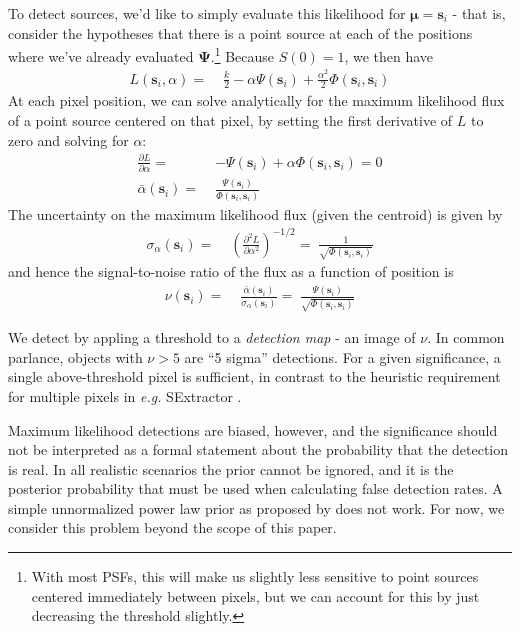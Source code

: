 \documentclass[10pt]{article}
\begin{document}
To detect sources, we'd like to simply evaluate this likelihood for $\bm{\mu} = \bm{s}_i$ - that is, consider the hypotheses that there is a point source at each of the positions where we've already evaluated $\bm{\Psi}$.\footnote{With most PSFs, this will make us slightly less sensitive to point sources centered immediately between pixels, but we can account for this by just decreasing the threshold slightly.}  Because $S(0)=1$, we then have
\begin{align}
L(\bm{s}_i,\alpha) =\;& \frac{k}{2} -\alpha \Psi(\bm{s}_i)
    + \frac{\alpha^2}{2} \Phi(\bm{s}_i,\bm{s}_i)
\end{align}
At each pixel position, we can solve analytically for the maximum likelihood flux of a point source centered on that pixel, by setting the first derivative of $L$ to zero and solving for $\alpha$:
\begin{align}
\frac{\partial L}{\partial \alpha} =\;&
    -\Psi(\bm{s}_i) + \alpha \Phi(\bm{s}_i,\bm{s}_i) = 0\\
\bar{\alpha}(\bm{s}_i) =\;& \frac{\Psi(\bm{s}_i)}{\Phi(\bm{s}_i,\bm{s}_i)}
\end{align}
The uncertainty on the maximum likelihood flux (given the centroid) is given by
\begin{align}
\sigma_{\alpha}(\bm{s}_i) =\;&
    \left(\frac{\partial^2 L}{\partial \alpha^2}\right)^{-1/2}
    =\; \frac{1}{\sqrt{\Phi(\bm{s}_i,\bm{s}_i)}}
\end{align}
and hence the signal-to-noise ratio of the flux as a function of position is
\begin{align}
\nu(\bm{s}_i) =\;&
    \frac{\bar{\alpha}(\bm{s}_i)}{\sigma_{\alpha}(\bm{s}_i)} =\;
    \frac{\Psi(\bm{s}_i)}{\sqrt{\Phi(\bm{s}_i,\bm{s}_i)}}
\end{align}

We detect by appling a threshold to a \emph{detection map} - an image of $\nu$.  In common parlance, objects with $\nu>5$ are ``5 sigma'' detections.  For a given significance, a single above-threshold pixel is sufficient, in contrast to the heuristic requirement for multiple pixels in \textit{e.g.} SExtractor \citep{1996A&AS..117..393B}.

Maximum likelihood detections are biased, however, and the significance should not be interpreted as a formal statement about the probability that the detection is real.  In all realistic scenarios the prior cannot be ignored, and it is the posterior probability that must be used when calculating false detection rates.  A simple unnormalized power law prior as proposed by \cite{1998PASP..110..727H} does not work.  For now, we consider this problem beyond the scope of this paper.
\end{document}
